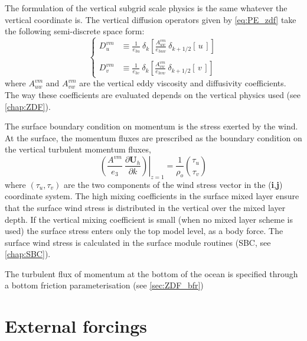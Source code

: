 \documentclass[../tex_main/NEMO_manual]{subfiles}
\begin{document}
The formulation of the vertical subgrid scale physics is the same whatever the vertical coordinate is.
The vertical diffusion operators given by \autoref{eq:PE_zdf} take the following semi-discrete space form:
\begin{equation} \label{eq:dynzdf}
\left\{   \begin{aligned}
D_u^{vm} &\equiv \frac{1}{e_{3u}} \ \delta _k \left[ \frac{A_{uw}^{vm} }{e_{3uw} }
                              \ \delta _{k+1/2} [\,u\,]         \right]     \\
\\
D_v^{vm} &\equiv \frac{1}{e_{3v}} \ \delta _k \left[ \frac{A_{vw}^{vm} }{e_{3vw} }
                              \ \delta _{k+1/2} [\,v\,]         \right]
\end{aligned}   \right.
\end{equation} 
where $A_{uw}^{vm} $ and $A_{vw}^{vm} $ are the vertical eddy viscosity and diffusivity coefficients.
The way these coefficients are evaluated depends on the vertical physics used (see \autoref{chap:ZDF}).

The surface boundary condition on momentum is the stress exerted by the wind.
At the surface, the momentum fluxes are prescribed as the boundary condition on
the vertical turbulent momentum fluxes,
\begin{equation} \label{eq:dynzdf_sbc}
\left.{\left( {\frac{A^{vm} }{e_3 }\ \frac{\partial \textbf{U}_h}{\partial k}} \right)} \right|_{z=1}
	 = \frac{1}{\rho _o} \binom{\tau _u}{\tau _v }
\end{equation}
where $\left( \tau _u ,\tau _v \right)$ are the two components of the wind stress vector in
the (\textbf{i},\textbf{j}) coordinate system.
The high mixing coefficients in the surface mixed layer ensure that the surface wind stress is distributed in 
the vertical over the mixed layer depth.
If the vertical mixing coefficient is small (when no mixed layer scheme is used)
the surface stress enters only the top model level, as a body force.
The surface wind stress is calculated in the surface module routines (SBC, see \autoref{chap:SBC}).

The turbulent flux of momentum at the bottom of the ocean is specified through a bottom friction parameterisation
(see \autoref{sec:ZDF_bfr})

\section{External forcings}
\label{sec:DYN_forcing}
\end{document}
